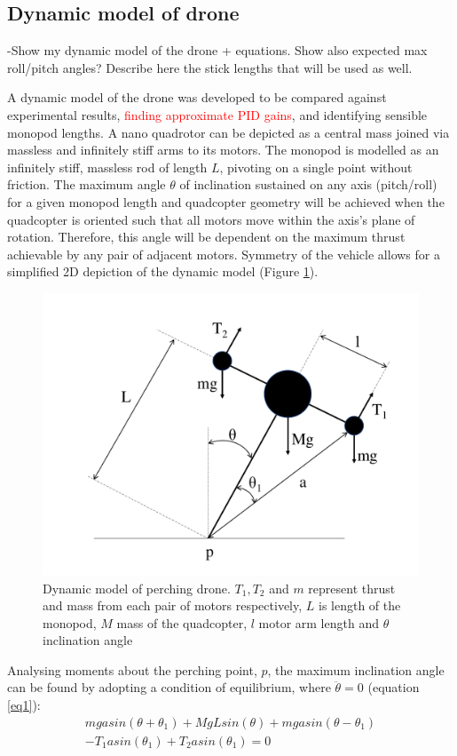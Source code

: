 \documentclass[12pt,a4paper]{article}
\begin{document}
\subsection{Dynamic model of drone}
-Show my dynamic model of the drone + equations. Show also expected max roll/pitch angles? Describe here the stick lengths that will be used as well.


A dynamic model of the drone was developed to be compared against experimental results, \textcolor{red}{finding approximate PID gains}, and identifying sensible monopod lengths. A nano quadrotor can be depicted as a central mass joined via massless and infinitely stiff arms to its motors. The monopod is modelled as an infinitely stiff, massless rod of length $L$, pivoting on a single point without friction. The maximum angle $\theta$ of inclination sustained on any axis (pitch/roll) for a given monopod length and quadcopter geometry will be achieved when the quadcopter is oriented such that all motors move within the axis's plane of rotation. Therefore, this angle will be dependent on the maximum thrust achievable by any pair of adjacent motors. Symmetry of the vehicle allows for a simplified 2D depiction of the dynamic model (Figure \ref{fig2}).

\begin{figure}[h!]
\centering
 \includegraphics[scale=0.5]{dynamic_model.pdf}
  \caption{Dynamic model of perching drone. $T_1,T_2$ and $m$ represent thrust and mass from each pair of motors respectively, $L$ is length of the monopod, $M$ mass of the quadcopter, $l$ motor arm length and $\theta$ inclination angle}
  \label{fig2}
\end{figure}
Analysing moments about the perching point, $p$, the maximum inclination angle can be found by adopting a condition of equilibrium, where $\ddot{\theta} = 0$ (equation \ref{eq1}):
\begin{equation}
\begin{split}
mgasin(\theta + \theta_1) + MgLsin(\theta) + 
mgasin(\theta-\theta_1) \\
-T_{1}asin(\theta_1) + T_2asin(\theta_1) = 0
\end{split}
\label{eq1}
\end{equation}
\end{document}
